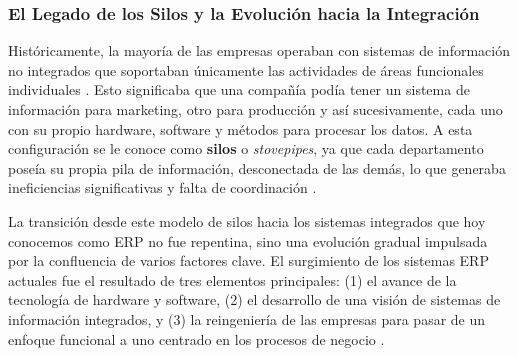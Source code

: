 \documentclass[12pt,letterpaper,spanish]{report}
\begin{document}

\subsubsection{El Legado de los Silos y la Evolución hacia la Integración}

Históricamente, la mayoría de las empresas operaban con sistemas de información no integrados que soportaban únicamente las actividades de áreas funcionales individuales \cite{book}. Esto significaba que una compañía podía tener un sistema de información para marketing, otro para producción y así sucesivamente, cada uno con su propio hardware, software y métodos para procesar los datos. A esta configuración se le conoce como \textbf{silos} o \textit{stovepipes}, ya que cada departamento poseía su propia pila de información, desconectada de las demás, lo que generaba ineficiencias significativas y falta de coordinación \cite{book}.

La transición desde este modelo de silos hacia los sistemas integrados que hoy conocemos como ERP no fue repentina, sino una evolución gradual impulsada por la confluencia de varios factores clave. El surgimiento de los sistemas ERP actuales fue el resultado de tres elementos principales: (1) el avance de la tecnología de hardware y software, (2) el desarrollo de una visión de sistemas de información integrados, y (3) la reingeniería de las empresas para pasar de un enfoque funcional a uno centrado en los procesos de negocio \cite{book}.
\end{document}
